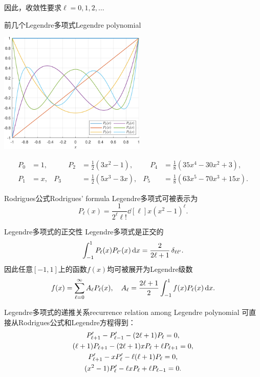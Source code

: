 因此，收敛性要求$\ell=0,1,2,\ldots$
\begin{example}{前几个Legendre多项式}{Legendre polynomial}
    \begin{center}
        \includegraphics[width=7cm]{graphs/Legendre.pdf}
    \end{center}
    \begin{equation*}
        \begin{aligned}
            P_0&=1,&\qquad P_2&=\frac12(3x^2-1),&\quad P_4&=\frac18(35x^4-30x^2+3),\\
            P_1&=x,&P_3&=\frac12(5x^3-3x),&P_5&=\frac18(63x^5-70x^3+15x).
        \end{aligned}
    \end{equation*}
\end{example}
\begin{theorem}{Rodrigues公式}{Rodrigues' formula}
    Legendre多项式可被表示为
    \begin{equation}
        \label{eqn:Rodrigues}
        P_\ell(x)=\frac1{2^\ell\ell!}\dd[\ell]x(x^2-1)^\ell.
    \end{equation}
\end{theorem}
\begin{theorem}
    {Legendre多项式的正交性}{}
    Legendre多项式是正交的
    \[
        \int_{-1}^1P_\ell(x)P_{\ell'}(x)\mathop{}\!\mathrm{d} x=\frac2{2\ell+1}\mathop{}\!\delta_{\ell\ell'}.
    \]
    因此任意$[-1,1]$上的函数$f(x)$均可被展开为Legendre级数
    \[
        f(x)=\sum_{\ell=0}^\infty A_\ell P_\ell(x),\quad A_\ell=\frac{2\ell+1}2\int_{-1}^1f(x)P_\ell(x)\mathop{}\!\mathrm{d} x.
    \]
\end{theorem}
\begin{theorem}{Legendre多项式的递推关系}{recurrence relation among Legendre polynomial}
    可直接从Rodrigues公式和Legendre方程得到：
    \begin{gather}
        \label{eqn:Legendre 1 recurrence}
        P'_{\ell+1}-P'_{\ell-1}-(2\ell+1)P_\ell=0,\\
        (\ell+1)P_{\ell+1}-(2\ell+1)xP_\ell+\ell P_{\ell+1}=0,\\
        \notag
        P'_{\ell+1}-xP'_\ell-\ell(\ell+1)P_\ell=0,\\
        \notag
        (x^2-1)P'_\ell-\ell xP_\ell+\ell P_{\ell-1}=0.
    \end{gather}
\end{theorem}
